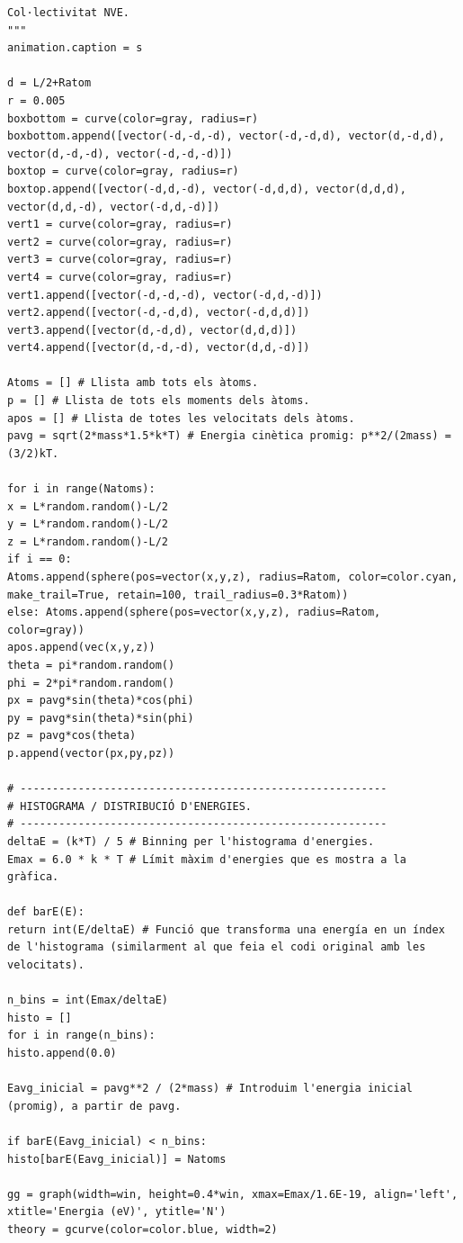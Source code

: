 \documentclass[a4paper,10.5pt]{report}
\begin{document}
\begin{appendices}
\begin{lstlisting}[caption={Simulació de la distribució d'energies i energia total del sistema en funció del temps sense implementar el termostat d'Andersen (col·lectivitat NVE, microcanònica).}]
Col·lectivitat NVE.
"""
animation.caption = s

d = L/2+Ratom
r = 0.005
boxbottom = curve(color=gray, radius=r)
boxbottom.append([vector(-d,-d,-d), vector(-d,-d,d), vector(d,-d,d), vector(d,-d,-d), vector(-d,-d,-d)])
boxtop = curve(color=gray, radius=r)
boxtop.append([vector(-d,d,-d), vector(-d,d,d), vector(d,d,d), vector(d,d,-d), vector(-d,d,-d)])
vert1 = curve(color=gray, radius=r)
vert2 = curve(color=gray, radius=r)
vert3 = curve(color=gray, radius=r)
vert4 = curve(color=gray, radius=r)
vert1.append([vector(-d,-d,-d), vector(-d,d,-d)])
vert2.append([vector(-d,-d,d), vector(-d,d,d)])
vert3.append([vector(d,-d,d), vector(d,d,d)])
vert4.append([vector(d,-d,-d), vector(d,d,-d)])

Atoms = [] # Llista amb tots els àtoms.
p = [] # Llista de tots els moments dels àtoms.
apos = [] # Llista de totes les velocitats dels àtoms.
pavg = sqrt(2*mass*1.5*k*T) # Energia cinètica promig: p**2/(2mass) = (3/2)kT.

for i in range(Natoms):
x = L*random.random()-L/2
y = L*random.random()-L/2
z = L*random.random()-L/2
if i == 0:
Atoms.append(sphere(pos=vector(x,y,z), radius=Ratom, color=color.cyan, make_trail=True, retain=100, trail_radius=0.3*Ratom))
else: Atoms.append(sphere(pos=vector(x,y,z), radius=Ratom, color=gray))
apos.append(vec(x,y,z))
theta = pi*random.random()
phi = 2*pi*random.random()
px = pavg*sin(theta)*cos(phi)
py = pavg*sin(theta)*sin(phi)
pz = pavg*cos(theta)
p.append(vector(px,py,pz))

# ---------------------------------------------------------
# HISTOGRAMA / DISTRIBUCIÓ D'ENERGIES.
# ---------------------------------------------------------
deltaE = (k*T) / 5 # Binning per l'histograma d'energies.
Emax = 6.0 * k * T # Límit màxim d'energies que es mostra a la gràfica.

def barE(E):
return int(E/deltaE) # Funció que transforma una energía en un índex de l'histograma (similarment al que feia el codi original amb les velocitats).

n_bins = int(Emax/deltaE)
histo = []
for i in range(n_bins):
histo.append(0.0)

Eavg_inicial = pavg**2 / (2*mass) # Introduim l'energia inicial (promig), a partir de pavg.

if barE(Eavg_inicial) < n_bins:
histo[barE(Eavg_inicial)] = Natoms

gg = graph(width=win, height=0.4*win, xmax=Emax/1.6E-19, align='left', 
xtitle='Energia (eV)', ytitle='N')
theory = gcurve(color=color.blue, width=2)



\end{lstlisting}
\end{appendices}
\end{document}
